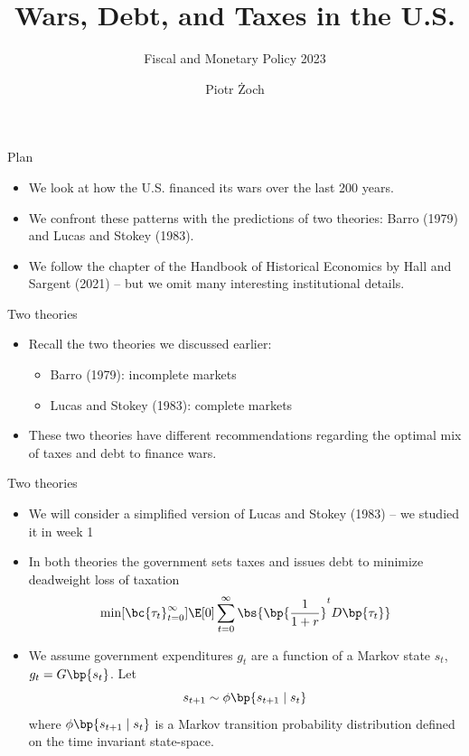 \documentclass[11pt,xcolor={dvipsnames},hyperref={pdftex,pdfpagemode=UseNone,hidelinks,pdfdisplaydoctitle=true},usepdftitle=false]{beamer}
\begin{document}
\title{Wars, Debt, and Taxes in the U.S.}
\subtitle{Fiscal and Monetary Policy 2023}

\author{Piotr Żoch}%
\frame{\titlepage}

\begin{frame}{Plan}
    \begin{itemize}
    \item We look at how the U.S. financed its wars over the last 200 years.
    \item We confront these patterns with the predictions of two theories: Barro (1979) and Lucas and Stokey (1983).
    \item We follow the chapter of the Handbook of Historical Economics by Hall and Sargent (2021) -- but we omit many interesting institutional details.
    \end{itemize}
\end{frame}


    \begin{frame}
    \end{frame}

    \begin{frame}{Two theories}
    \begin{itemize}
    \item Recall the two theories we discussed earlier:
    \begin{itemize}
    \item Barro (1979): incomplete markets
    \item Lucas and Stokey (1983): complete markets
    \end{itemize}
    \item These two theories have different recommendations regarding the optimal mix of taxes and debt to finance wars.
    \end{itemize}
    \end{frame}

    \begin{frame}{Two theories}
    \begin{itemize}
        \item We will consider a simplified version of Lucas and Stokey (1983) -- we studied it in week 1
        \item In both theories the government sets taxes and issues debt to minimize deadweight loss of taxation
        \[
        \min[\bc{\tau_t}_{t=0}^\infty] \E[0] \sum_{t=0}^\infty \bs{\bp{\frac{1}{1+r}}^t D\bp{\tau_t}}
        \]
        \item We assume government expenditures $g_t$ are a function of a Markov state $s_t$, $g_t = G\bp{s_t}$. Let $$s_{t+1} \sim \phi\bp{s_{t+1}\mid s_t }$$ where 
        $ \phi\bp{s_{t+1}\mid s_t }$ is a Markov transition probability distribution defined on the time invariant
        state-space.
    \end{itemize}
    \end{frame}
\end{document}
